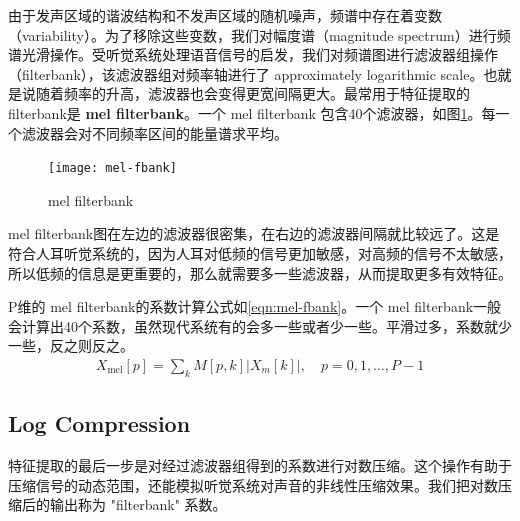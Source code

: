 由于发声区域的谐波结构和不发声区域的随机噪声，频谱中存在着变数（variability）。为了移除这些变数，我们对幅度谱（magnitude spectrum）进行频谱光滑操作。受听觉系统处理语音信号的启发，我们对频谱图进行滤波器组操作（filterbank），该滤波器组对频率轴进行了 approximately logarithmic scale。也就是说随着频率的升高，滤波器也会变得更宽间隔更大。最常用于特征提取的filterbank是 {\bf mel filterbank}。一个 mel filterbank 包含40个滤波器，如图\ref{fig:mel-fbank}。每一个滤波器会对不同频率区间的能量谱求平均。
\begin{figure}[htbp]
	\centering
	\texttt{[image: mel-fbank]}
	\caption{mel filterbank \label{fig:mel-fbank}}
\end{figure}

mel filterbank图在左边的滤波器很密集，在右边的滤波器间隔就比较远了。这是符合人耳听觉系统的，因为人耳对低频的信号更加敏感，对高频的信号不太敏感，所以低频的信息是更重要的，那么就需要多一些滤波器，从而提取更多有效特征。

P维的 mel filterbank的系数计算公式如\ref{eqn:mel-fbank}。一个 mel filterbank一般会计算出40个系数，虽然现代系统有的会多一些或者少一些。平滑过多，系数就少一些，反之则反之。
\begin{align}
\label{eqn:mel-fbank}
	X_{\mathrm{mel}}[p]=\sum_{k} M[p, k]\left|X_{m}[k]\right|, \quad p=0,1, \ldots, P-1
\end{align}


\subsection{Log Compression} %
\label{sub:log_compression}
特征提取的最后一步是对经过滤波器组得到的系数进行对数压缩。这个操作有助于压缩信号的动态范围，还能模拟听觉系统对声音的非线性压缩效果。我们把对数压缩后的输出称为 "filterbank" 系数。

